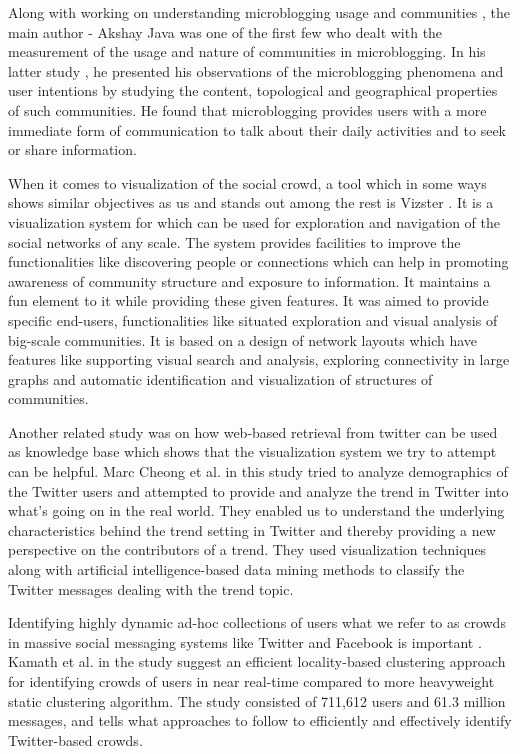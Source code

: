 \documentclass{sig-alternate}
\begin{document}
Along with working on understanding microblogging usage and communities
\cite{Java:2007}, the main author - Akshay Java was one of the first few who
dealt with the measurement of the usage and nature of communities in
microblogging. In his latter study \cite{Java:2008}, he presented his
observations of the microblogging phenomena and user intentions by studying the
content, topological and geographical properties of such communities. He found
that microblogging provides users with a more immediate form of communication
to talk about their daily activities and to seek or share information.

When it comes to visualization of the social crowd, a tool which in some ways
shows similar objectives as us and stands out among the rest is Vizster
\cite{Heer:2005}. It is a visualization system for which can be used for
exploration and navigation of the social networks of any scale. The system
provides facilities to improve the functionalities like discovering people or
connections which can help in promoting awareness of community structure and
exposure to information. It maintains a fun element to it while providing these
given features. It was aimed to provide specific end-users, functionalities
like situated exploration and visual analysis of big-scale communities. It is
based on a design of network layouts which have features like supporting visual
search and analysis, exploring connectivity in large graphs and automatic
identification and visualization of structures of communities.

Another related study was on how web-based retrieval from twitter can be used
as knowledge base \cite{Cheong:2009} which shows that the visualization system
we try to attempt can be helpful. Marc Cheong et al. in this study tried to
analyze demographics of the Twitter users and attempted to provide and analyze
the trend in Twitter into what's going on in the real world. They enabled us to
understand the underlying characteristics behind the trend setting in Twitter
and thereby providing a new perspective on the contributors of a trend. They
used visualization techniques along with artificial intelligence-based data
mining methods to classify the Twitter messages dealing with the trend topic.

Identifying highly dynamic ad-hoc collections of users what we refer to as
crowds in massive social messaging systems like Twitter and Facebook is
important \cite{krishna:2010}. Kamath et al. in the study suggest an
efficient locality-based clustering approach for identifying crowds of users in
near real-time compared to more heavyweight static clustering algorithm. The
study consisted of 711,612 users and 61.3 million messages, and tells what
approaches to follow to efficiently and effectively identify Twitter-based
crowds.
\end{document}
